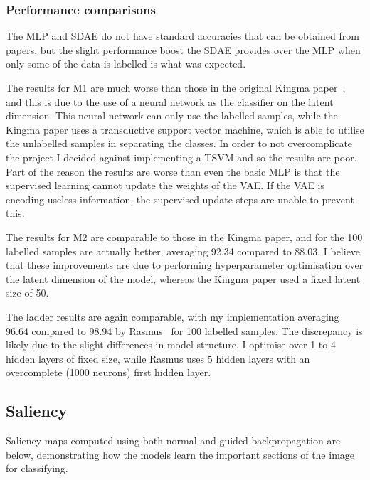 \subsubsection{Performance comparisons}
The MLP and SDAE do not have standard accuracies that can be obtained from papers, but the slight performance boost the SDAE provides 
over the MLP when only some of the data is labelled is what was expected.

The results for M1 are much worse than those in the original Kingma paper~\cite{DBLP:journals/corr/KingmaRMW14}, and this is due to the use
of a neural network as the classifier on the latent dimension. This neural network can only use the labelled samples, while the Kingma 
paper uses a transductive support vector machine, which is able to utilise the unlabelled samples in separating the classes. In order to
not overcomplicate the project I decided against implementing a TSVM and so the results are poor. Part of the reason the results are worse 
than even the basic MLP is that the supervised learning cannot update the weights of the VAE. If the VAE is encoding useless information, 
the supervised update steps are unable to prevent this.

The results for M2 are comparable to those in the Kingma paper, and for the 100 labelled samples are actually better, averaging 92.34 
compared to 88.03. I believe that these improvements are due to performing hyperparameter optimisation over the latent dimension of the 
model, whereas the Kingma paper used a fixed latent size of 50.

The ladder results are again comparable, with my implementation averaging 96.64 compared to 98.94 by Rasmus~\cite{DBLP:journals/corr/RasmusVHBR15}
for 100 labelled samples.
The discrepancy is likely due to the slight differences in model structure. I optimise over 1 to 4 hidden layers of fixed size,
while Rasmus uses 5 hidden layers with an overcomplete (1000 neurons) first hidden layer.

\subsection{Saliency}

Saliency maps computed using both normal and guided backpropagation are below, demonstrating how the models learn the important 
sections of the image for classifying.

